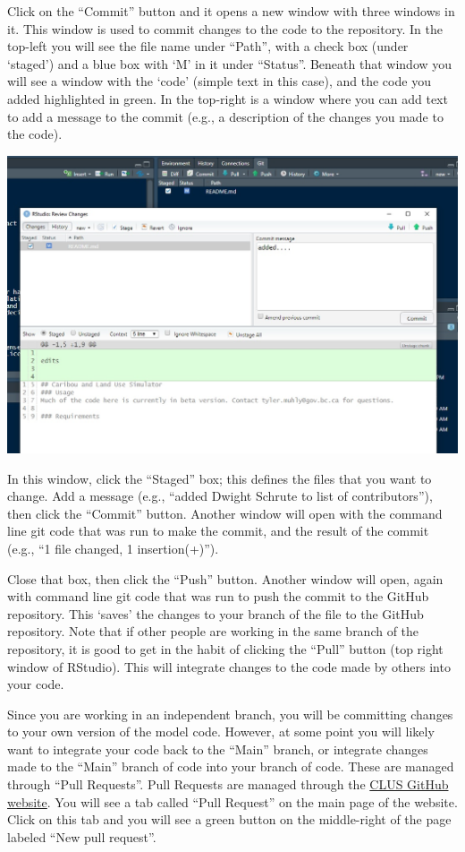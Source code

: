 \documentclass[
]{article}
\begin{document}
Click on the ``Commit'' button and it opens a new window with three
windows in it. This window is used to commit changes to the code to the
repository. In the top-left you will see the file name under ``Path'',
with a check box (under `staged') and a blue box with `M' in it under
``Status''. Beneath that window you will see a window with the `code'
(simple text in this case), and the code you added highlighted in green.
In the top-right is a window where you can add text to add a message to
the commit (e.g., a description of the changes you made to the code).

\includegraphics{images/git_commit.jpg}

In this window, click the ``Staged'' box; this defines the files that
you want to change. Add a message (e.g., ``added Dwight Schrute to list
of contributors''), then click the ``Commit'' button. Another window
will open with the command line git code that was run to make the
commit, and the result of the commit (e.g., ``1 file changed, 1
insertion(+)'').

Close that box, then click the ``Push'' button. Another window will
open, again with command line git code that was run to push the commit
to the GitHub repository. This `saves' the changes to your branch of the
file to the GitHub repository. Note that if other people are working in
the same branch of the repository, it is good to get in the habit of
clicking the ``Pull'' button (top right window of RStudio). This will
integrate changes to the code made by others into your code.

Since you are working in an independent branch, you will be committing
changes to your own version of the model code. However, at some point
you will likely want to integrate your code back to the ``Main'' branch,
or integrate changes made to the ``Main'' branch of code into your
branch of code. These are managed through ``Pull Requests''. Pull
Requests are managed through the
\href{https://github.com/bcgov/clus}{CLUS GitHub website}. You will see
a tab called ``Pull Request'' on the main page of the website. Click on
this tab and you will see a green button on the middle-right of the page
labeled ``New pull request''.
\end{document}
